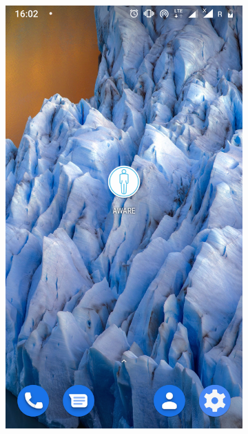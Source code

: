 \begin{enumerate}
	\begin{figure}[H]
		\centering
		\begin{subfigure}{0.35\textwidth}
			\centering
			\includegraphics[scale=0.14]{dodatekA/3_1.png}
			\subcaption{\label{subfigure_a}}
		\end{subfigure}
		\begin{subfigure}{0.35\textwidth}
			\centering

\end{subfigure}
\end{figure}
\end{enumerate}
